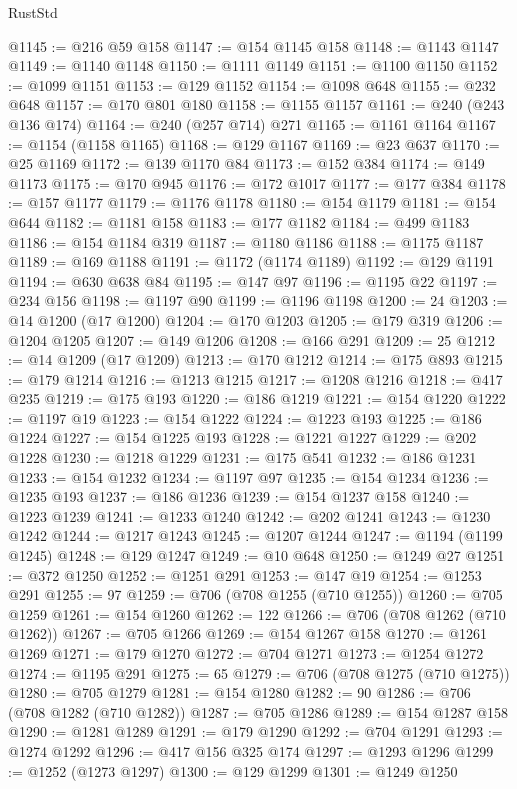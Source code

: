 \begin{lexlean}{RustStd}
\begin{coremodule}
@1145 := @216 @59 @158
@1147 := @154 @1145 @158
@1148 := @1143 @1147
@1149 := @1140 @1148
@1150 := @1111 @1149
@1151 := @1100 @1150
@1152 := @1099 @1151
@1153 := @129 @1152
@1154 := @1098 @648
@1155 := @232 @648
@1157 := @170 @801 @180
@1158 := @1155 @1157
@1161 := @240 (@243 @136 @174)
@1164 := @240 (@257 @714) @271
@1165 := @1161 @1164
@1167 := @1154 (@1158 @1165)
@1168 := @129 @1167
@1169 := @23 @637
@1170 := @25 @1169
@1172 := @139 @1170 @84
@1173 := @152 @384
@1174 := @149 @1173
@1175 := @170 @945
@1176 := @172 @1017
@1177 := @177 @384
@1178 := @157 @1177
@1179 := @1176 @1178
@1180 := @154 @1179
@1181 := @154 @644
@1182 := @1181 @158
@1183 := @177 @1182
@1184 := @499 @1183
@1186 := @154 @1184 @319
@1187 := @1180 @1186
@1188 := @1175 @1187
@1189 := @169 @1188
@1191 := @1172 (@1174 @1189)
@1192 := @129 @1191
@1194 := @630 @638 @84
@1195 := @147 @97
@1196 := @1195 @22
@1197 := @234 @156
@1198 := @1197 @90
@1199 := @1196 @1198
@1200 := 24
@1203 := @14 @1200 (@17 @1200)
@1204 := @170 @1203
@1205 := @179 @319
@1206 := @1204 @1205
@1207 := @149 @1206
@1208 := @166 @291
@1209 := 25
@1212 := @14 @1209 (@17 @1209)
@1213 := @170 @1212
@1214 := @175 @893
@1215 := @179 @1214
@1216 := @1213 @1215
@1217 := @1208 @1216
@1218 := @417 @235
@1219 := @175 @193
@1220 := @186 @1219
@1221 := @154 @1220
@1222 := @1197 @19
@1223 := @154 @1222
@1224 := @1223 @193
@1225 := @186 @1224
@1227 := @154 @1225 @193
@1228 := @1221 @1227
@1229 := @202 @1228
@1230 := @1218 @1229
@1231 := @175 @541
@1232 := @186 @1231
@1233 := @154 @1232
@1234 := @1197 @97
@1235 := @154 @1234
@1236 := @1235 @193
@1237 := @186 @1236
@1239 := @154 @1237 @158
@1240 := @1223 @1239
@1241 := @1233 @1240
@1242 := @202 @1241
@1243 := @1230 @1242
@1244 := @1217 @1243
@1245 := @1207 @1244
@1247 := @1194 (@1199 @1245)
@1248 := @129 @1247
@1249 := @10 @648
@1250 := @1249 @27
@1251 := @372 @1250
@1252 := @1251 @291
@1253 := @147 @19
@1254 := @1253 @291
@1255 := 97
@1259 := @706 (@708 @1255 (@710 @1255))
@1260 := @705 @1259
@1261 := @154 @1260
@1262 := 122
@1266 := @706 (@708 @1262 (@710 @1262))
@1267 := @705 @1266
@1269 := @154 @1267 @158
@1270 := @1261 @1269
@1271 := @179 @1270
@1272 := @704 @1271
@1273 := @1254 @1272
@1274 := @1195 @291
@1275 := 65
@1279 := @706 (@708 @1275 (@710 @1275))
@1280 := @705 @1279
@1281 := @154 @1280
@1282 := 90
@1286 := @706 (@708 @1282 (@710 @1282))
@1287 := @705 @1286
@1289 := @154 @1287 @158
@1290 := @1281 @1289
@1291 := @179 @1290
@1292 := @704 @1291
@1293 := @1274 @1292
@1296 := @417 @156 @325 @174
@1297 := @1293 @1296
@1299 := @1252 (@1273 @1297)
@1300 := @129 @1299
@1301 := @1249 @1250

\end{coremodule}
\end{lexlean}
